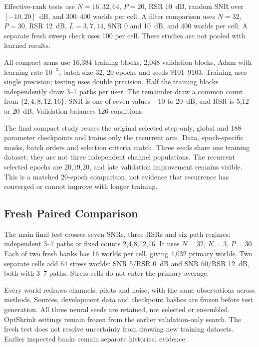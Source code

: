 \documentclass[10pt,journal,letterpaper]{IEEEtran}
\begin{document}
Effective-rank tests use $N=16,32,64$, $P=20$, RSR 10~dB, random SNR over $[-10,20]$~dB, and 300--400 worlds per cell. A filter comparison uses $N=32$, $P=30$, RSR 12~dB, $L=3,7,14$, SNR 0 and 10~dB, and 400 worlds per cell. A separate fresh sweep check uses 100 per cell. These studies are not pooled with learned results.

All compact arms use 16,384 training blocks, 2,048 validation blocks, Adam with learning rate $10^{-3}$, batch size 32, 20 epochs and seeds 9101--9103. Training uses single precision; testing uses double precision. Half the training blocks independently draw 3--7 paths per user. The remainder draw a common count from $\{2,4,8,12,16\}$. SNR is one of seven values $-10$ to 20~dB, and RSR is 5,12 or 20~dB. Validation balances 126 conditions.

The final compact study reuses the original selected step-only, global and 188-parameter checkpoints and trains only the recurrent arm. Data, epoch-specific masks, batch orders and selection criteria match. Three seeds share one training dataset; they are not three independent channel populations. The recurrent selected epochs are 20,19,20, and late validation improvement remains visible. This is a matched 20-epoch comparison, not evidence that recurrence has converged or cannot improve with longer training.

\subsection{Fresh Paired Comparison}
The main final test crosses seven SNRs, three RSRs and six path regimes: independent 3--7 paths or fixed counts 2,4,8,12,16. It uses $N=32$, $K=3$, $P=30$. Each of two fresh banks has 16 worlds per cell, giving 4,032 primary worlds. Two separate cells add 64 stress worlds: SNR 5/RSR 0~dB and SNR 60/RSR 12~dB, both with 3--7 paths. Stress cells do not enter the primary average.

Every world redraws channels, pilots and noise, with the same observations across methods. Sources, development data and checkpoint hashes are frozen before test generation. All three neural seeds are retained, not selected or ensembled. OptShrink settings remain frozen from the earlier validation-only search. The fresh test does not resolve uncertainty from drawing new training datasets. Earlier inspected banks remain separate historical evidence.
\end{document}
